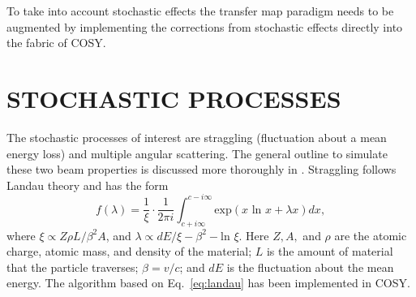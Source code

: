 \documentclass{jacow}
\begin{document}

To take into account stochastic effects the transfer map paradigm needs to be augmented by implementing the corrections from stochastic effects directly into the fabric of COSY. %

\section{STOCHASTIC PROCESSES}
The stochastic processes of interest are straggling (fluctuation about a mean energy loss) and multiple angular scattering. The general outline to simulate these two beam properties is discussed more thoroughly in \cite{icap15}. Straggling follows Landau theory and has the form \cite{landau}
\begin{equation}
f(\lambda) = \frac{1}{\xi} \cdot \frac{1}{2\pi i} \int_{c+i \infty} ^{c-i \infty} \text{exp}(x\text{ ln } x + \lambda x) dx,
\label{eq:landau}
\end{equation}
where $\xi \propto Z\rho L/\beta^2 A$, and $\lambda \propto dE/\xi - \beta^2 - \text{ln } \xi$. Here $Z, A,$ and $\rho$ are the atomic charge, atomic mass, and density of the material; $L$ is the amount of material that the particle traverses; $\beta=v/c$; and $dE$ is the fluctuation about the mean energy. The algorithm based on Eq.~\eqref{eq:landau} has been implemented in COSY.
\end{document}
